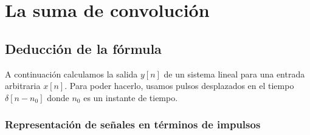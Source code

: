 \chapter{La suma de convoluci\'{o}n}

\section{Deducci\'{o}n de la f\'{o}rmula}

A continuaci\'{o}n calculamos la salida $y[n]$ de un sistema lineal  para una entrada arbitraria $x[n]$. 
Para poder hacerlo, usamos pulsos desplazados en el tiempo $\delta[n-n_{0}]$ 
donde $n_{0}$ es un instante de tiempo.

\subsection{Representaci\'{o}n de se\~{n}ales en t\'{e}rminos de
  impulsos}

